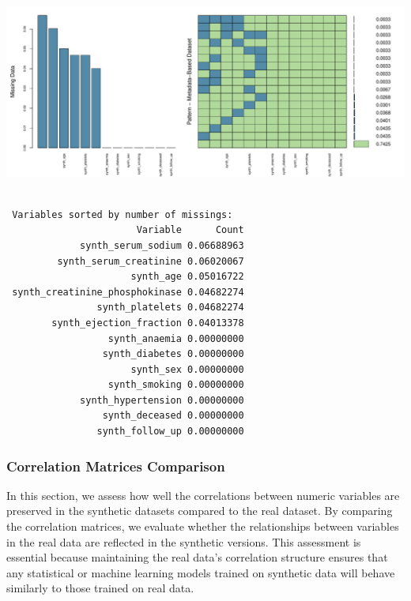 \documentclass[
  letterpaper,
  DIV=11,
  numbers=noendperiod]{scrartcl}
\begin{document}
\begin{center}
\includegraphics[width=1\linewidth,height=\textheight,keepaspectratio]{heart_failure_synthetic_data_project_files/figure-pdf/Missingness Maps-5.pdf}
\end{center}

\begin{verbatim}

 Variables sorted by number of missings: 
                       Variable      Count
             synth_serum_sodium 0.06688963
         synth_serum_creatinine 0.06020067
                      synth_age 0.05016722
 synth_creatinine_phosphokinase 0.04682274
                synth_platelets 0.04682274
        synth_ejection_fraction 0.04013378
                  synth_anaemia 0.00000000
                 synth_diabetes 0.00000000
                      synth_sex 0.00000000
                  synth_smoking 0.00000000
             synth_hypertension 0.00000000
                 synth_deceased 0.00000000
                synth_follow_up 0.00000000
\end{verbatim}

\subsubsection{Correlation Matrices
Comparison}\label{correlation-matrices-comparison}

In this section, we assess how well the correlations between numeric
variables are preserved in the synthetic datasets compared to the real
dataset. By comparing the correlation matrices, we evaluate whether the
relationships between variables in the real data are reflected in the
synthetic versions. This assessment is essential because maintaining the
real data's correlation structure ensures that any statistical or
machine learning models trained on synthetic data will behave similarly
to those trained on real data.
\end{document}
